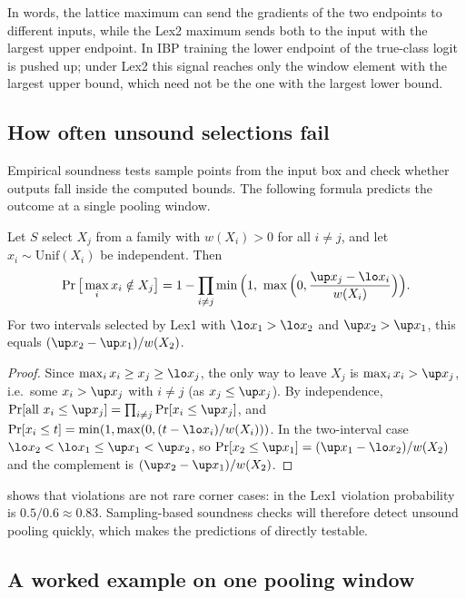 In words, the lattice maximum can send the gradients of the two endpoints to different inputs, while the Lex2 maximum sends both to the input with the largest upper endpoint. In IBP training the lower endpoint of the true-class logit is pushed up; under Lex2 this signal reaches only the window element with the largest upper bound, which need not be the one with the largest lower bound.

\subsection{How often unsound selections fail}

Empirical soundness tests sample points from the input box and check whether outputs fall inside the computed bounds. The following formula predicts the outcome at a single pooling window.

\begin{proposition}\label{prop:violation}
Let $S$ select $X_j$ from a family with $w(X_i)>0$ for all $i\ne j$, and let $x_i\sim\mathrm{Unif}(X_i)$ be independent. Then
\[
\Pr\big[\max_ix_i\notin X_j\big]=1-\prod_{i\ne j}\min\Big(1,\ \max\Big(0,\frac{\up x_j-\lo x_i}{w(X_i)}\Big)\Big).
\]
For two intervals selected by Lex1 with $\lo x_1>\lo x_2$ and $\up x_2>\up x_1$, this equals $(\up x_2-\up x_1)/w(X_2)$.
\end{proposition}

\begin{proof}
Since $\max_ix_i\ge x_j\ge\lo x_j$, the only way to leave $X_j$ is $\max_ix_i>\up x_j$, i.e.\ some $x_i>\up x_j$ with $i\ne j$ (as $x_j\le\up x_j$). By independence, $\Pr[\text{all }x_i\le\up x_j]=\prod_{i\ne j}\Pr[x_i\le\up x_j]$, and $\Pr[x_i\le t]=\min(1,\max(0,(t-\lo x_i)/w(X_i)))$. In the two-interval case $\lo x_2<\lo x_1\le\up x_1<\up x_2$, so $\Pr[x_2\le\up x_1]=(\up x_1-\lo x_2)/w(X_2)$ and the complement is $(\up x_2-\up x_1)/w(X_2)$.
\end{proof}

\begin{remark}
 shows that violations are not rare corner cases: in  the Lex1 violation probability is $0.5/0.6\approx0.83$. Sampling-based soundness checks will therefore detect unsound pooling quickly, which makes the predictions of  directly testable.
\end{remark}

\subsection{A worked example on one pooling window}

